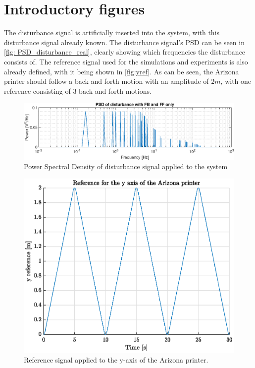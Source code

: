 \documentclass[journal]{IEEEtran}
\begin{document}
\section{Introductory figures}
The disturbance signal is artificially inserted into the system, with this disturbance signal already known. The disturbance signal's PSD can be seen in \autoref{fig: PSD_disturbance_real}, clearly showing which frequencies the disturbance consists of. The reference signal used for the simulations and experiments is also already defined, with it being shown in \autoref{fig:yref}. As can be seen, the Arizona printer should follow a back and forth motion with an amplitude of $2m$, with one reference consisting of 3 back and forth motions. 
\begin{figure}[!b]
    \centering
    \includegraphics[width=1\linewidth]{figures/General/disturbancePower_real_2.eps}
    \caption{Power Spectral Density of disturbance signal applied to the system}
    \label{fig: PSD_disturbance_real}
\end{figure}
\begin{figure}
    \centering
    \includegraphics[width=1\linewidth]{figures/General/Ref.eps}
    \caption{Reference signal applied to the y-axis of the Arizona printer.}
    \label{fig:yref}
\end{figure}
\end{document}
